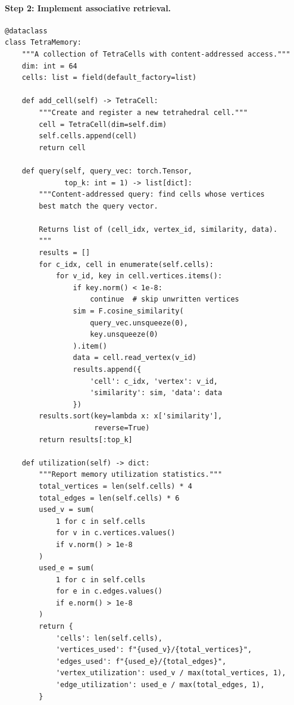 \paragraph{Step 2: Implement associative retrieval.}

\begin{lstlisting}[style=dogmapython, caption={Lab 4: Associative retrieval and content-addressed queries.}]
@dataclass
class TetraMemory:
    """A collection of TetraCells with content-addressed access."""
    dim: int = 64
    cells: list = field(default_factory=list)

    def add_cell(self) -> TetraCell:
        """Create and register a new tetrahedral cell."""
        cell = TetraCell(dim=self.dim)
        self.cells.append(cell)
        return cell

    def query(self, query_vec: torch.Tensor,
              top_k: int = 1) -> list[dict]:
        """Content-addressed query: find cells whose vertices
        best match the query vector.

        Returns list of (cell_idx, vertex_id, similarity, data).
        """
        results = []
        for c_idx, cell in enumerate(self.cells):
            for v_id, key in cell.vertices.items():
                if key.norm() < 1e-8:
                    continue  # skip unwritten vertices
                sim = F.cosine_similarity(
                    query_vec.unsqueeze(0),
                    key.unsqueeze(0)
                ).item()
                data = cell.read_vertex(v_id)
                results.append({
                    'cell': c_idx, 'vertex': v_id,
                    'similarity': sim, 'data': data
                })
        results.sort(key=lambda x: x['similarity'],
                     reverse=True)
        return results[:top_k]

    def utilization(self) -> dict:
        """Report memory utilization statistics."""
        total_vertices = len(self.cells) * 4
        total_edges = len(self.cells) * 6
        used_v = sum(
            1 for c in self.cells
            for v in c.vertices.values()
            if v.norm() > 1e-8
        )
        used_e = sum(
            1 for c in self.cells
            for e in c.edges.values()
            if e.norm() > 1e-8
        )
        return {
            'cells': len(self.cells),
            'vertices_used': f"{used_v}/{total_vertices}",
            'edges_used': f"{used_e}/{total_edges}",
            'vertex_utilization': used_v / max(total_vertices, 1),
            'edge_utilization': used_e / max(total_edges, 1),
        }
\end{lstlisting}

